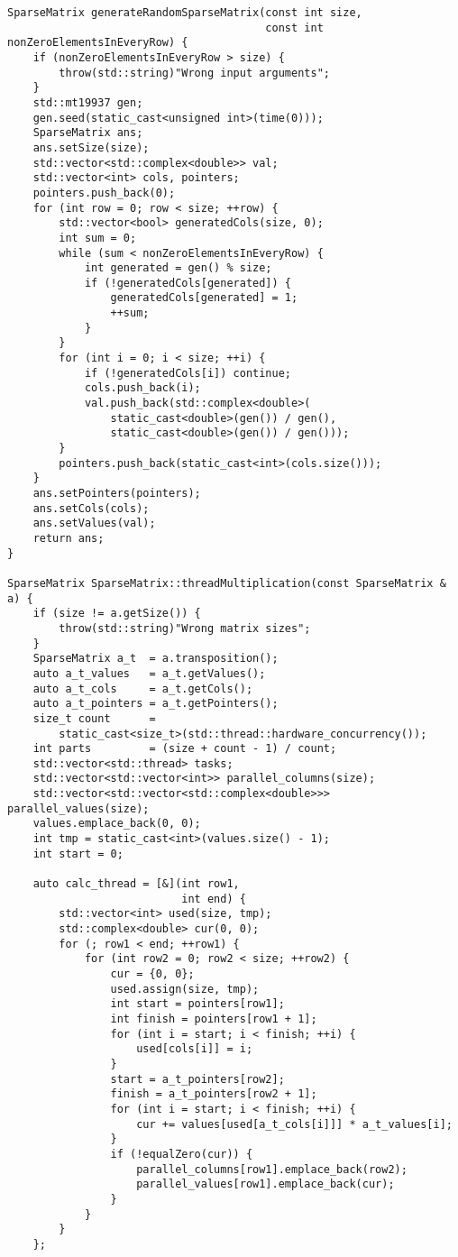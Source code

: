 \documentclass{report}
\begin{document}
\begin{lstlisting}
SparseMatrix generateRandomSparseMatrix(const int size,
                                        const int nonZeroElementsInEveryRow) {
    if (nonZeroElementsInEveryRow > size) {
        throw(std::string)"Wrong input arguments";
    }
    std::mt19937 gen;
    gen.seed(static_cast<unsigned int>(time(0)));
    SparseMatrix ans;
    ans.setSize(size);
    std::vector<std::complex<double>> val;
    std::vector<int> cols, pointers;
    pointers.push_back(0);
    for (int row = 0; row < size; ++row) {
        std::vector<bool> generatedCols(size, 0);
        int sum = 0;
        while (sum < nonZeroElementsInEveryRow) {
            int generated = gen() % size;
            if (!generatedCols[generated]) {
                generatedCols[generated] = 1;
                ++sum;
            }
        }
        for (int i = 0; i < size; ++i) {
            if (!generatedCols[i]) continue;
            cols.push_back(i);
            val.push_back(std::complex<double>(
                static_cast<double>(gen()) / gen(),
                static_cast<double>(gen()) / gen()));
        }
        pointers.push_back(static_cast<int>(cols.size()));
    }
    ans.setPointers(pointers);
    ans.setCols(cols);
    ans.setValues(val);
    return ans;
}

SparseMatrix SparseMatrix::threadMultiplication(const SparseMatrix & a) {
    if (size != a.getSize()) {
        throw(std::string)"Wrong matrix sizes";
    }
    SparseMatrix a_t  = a.transposition();
    auto a_t_values   = a_t.getValues();
    auto a_t_cols     = a_t.getCols();
    auto a_t_pointers = a_t.getPointers();
    size_t count      =
        static_cast<size_t>(std::thread::hardware_concurrency());
    int parts         = (size + count - 1) / count;
    std::vector<std::thread> tasks;
    std::vector<std::vector<int>> parallel_columns(size);
    std::vector<std::vector<std::complex<double>>> parallel_values(size);
    values.emplace_back(0, 0);
    int tmp = static_cast<int>(values.size() - 1);
    int start = 0;

    auto calc_thread = [&](int row1,
                           int end) {
        std::vector<int> used(size, tmp);
        std::complex<double> cur(0, 0);
        for (; row1 < end; ++row1) {
            for (int row2 = 0; row2 < size; ++row2) {
                cur = {0, 0};
                used.assign(size, tmp);
                int start = pointers[row1];
                int finish = pointers[row1 + 1];
                for (int i = start; i < finish; ++i) {
                    used[cols[i]] = i;
                }
                start = a_t_pointers[row2];
                finish = a_t_pointers[row2 + 1];
                for (int i = start; i < finish; ++i) {
                    cur += values[used[a_t_cols[i]]] * a_t_values[i];
                }
                if (!equalZero(cur)) {
                    parallel_columns[row1].emplace_back(row2);
                    parallel_values[row1].emplace_back(cur);
                }
            }
        }
    };


\end{lstlisting}
\end{document}
